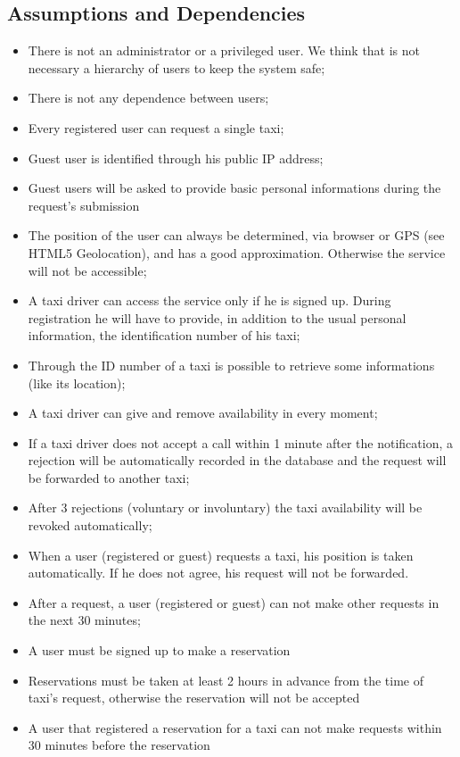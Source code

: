 	\subsection{Assumptions and Dependencies}
		\begin{itemize}
			\item There is not an administrator or a privileged user. We think that is not
			necessary a hierarchy of users to keep the system safe;
			\item There is not any dependence between users;
			\item Every registered user can request a single taxi;
			\item Guest user is identified through his public IP address;
			\item Guest users will be asked to provide basic personal informations during the
			request's submission
			\item The position of the user can always be determined, via browser or GPS
			(see HTML5 Geolocation), and has a good approximation. Otherwise the service will not
			be accessible;
			\item A taxi driver can access the service only if he is signed up. During
			registration he will have to provide, in addition to the usual personal information,
			the identification number of his taxi;
			\item Through the ID number of a taxi is possible to retrieve some informations (like
			its location);
			\item A taxi driver can give and remove availability in every moment;
			\item If a taxi driver does not accept a call within 1 minute after the notification,
			a rejection will be automatically recorded in the database and the request will be
			forwarded to another taxi;
			\item After 3 rejections (voluntary or involuntary) the taxi availability will be 
			revoked automatically;
			\item When a user (registered or guest) requests a taxi, his position is taken automatically.
			If he does not agree, his request will not be forwarded.
			\item After a request, a user (registered or guest) can not make other requests in the next 30 minutes;
			\item A user must be signed up to make a reservation
			\item Reservations must be taken at least 2 hours in advance from the time of taxi's request,
			otherwise the reservation will not be accepted
			\item A user that registered a reservation for a taxi can not make requests within 30 minutes
			before the reservation
		\end{itemize}
